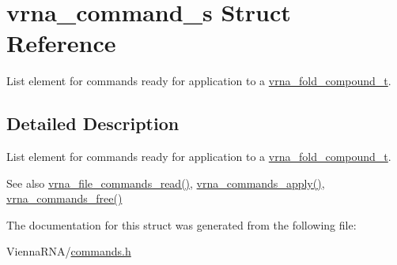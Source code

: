 \hypertarget{structvrna__command__s}{}\section{vrna\+\_\+command\+\_\+s Struct Reference}
\label{structvrna__command__s}


List element for commands ready for application to a \hyperlink{group__fold__compound_ga1b0cef17fd40466cef5968eaeeff6166}{vrna\+\_\+fold\+\_\+compound\+\_\+t}.  




\subsection{Detailed Description}
List element for commands ready for application to a \hyperlink{group__fold__compound_ga1b0cef17fd40466cef5968eaeeff6166}{vrna\+\_\+fold\+\_\+compound\+\_\+t}. 

\begin{DoxySeeAlso}{See also}
\hyperlink{commands_8h_a5d2a64331cff5b1059e7d327545d8a63}{vrna\+\_\+file\+\_\+commands\+\_\+read()}, \hyperlink{commands_8h_a5e993fc4b9602af73aaaab4d3b3cd9a9}{vrna\+\_\+commands\+\_\+apply()}, \hyperlink{commands_8h_a926fd7632e68f3da2e2069402b80b1ab}{vrna\+\_\+commands\+\_\+free()} 
\end{DoxySeeAlso}


The documentation for this struct was generated from the following file\+:\begin{DoxyCompactItemize}
\item 
Vienna\+R\+N\+A/\hyperlink{commands_8h}{commands.\+h}\end{DoxyCompactItemize}
